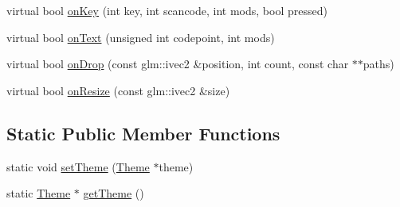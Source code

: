 \begin{DoxyCompactItemize}
\item 
virtual bool \mbox{\hyperlink{classec__gui_1_1_widget_a360664ea02b08a96e19c4c1cbdcd0fc8}{on\+Key}} (int key, int scancode, int mods, bool pressed)
\item 
virtual bool \mbox{\hyperlink{classec__gui_1_1_widget_a794ce0ee48989a1dbc40cad96a11eb9a}{on\+Text}} (unsigned int codepoint, int mods)
\item 
virtual bool \mbox{\hyperlink{classec__gui_1_1_widget_a4f4db0e6b761f3d659f2426d152a0ae2}{on\+Drop}} (const glm\+::ivec2 \&position, int count, const char $\ast$$\ast$paths)
\item 
virtual bool \mbox{\hyperlink{classec__gui_1_1_widget_a8894ab7ea0791865e6fe8ea5d909f071}{on\+Resize}} (const glm\+::ivec2 \&size)
\end{DoxyCompactItemize}
\subsection*{Static Public Member Functions}
\begin{DoxyCompactItemize}
\item 
static void \mbox{\hyperlink{classec__gui_1_1_widget_ab3f5e730d1360f86b17ebebd951723d2}{set\+Theme}} (\mbox{\hyperlink{classec__gui_1_1_theme}{Theme}} $\ast$theme)
\item 
static \mbox{\hyperlink{classec__gui_1_1_theme}{Theme}} $\ast$ \mbox{\hyperlink{classec__gui_1_1_widget_a32f0b514e4093da728d45e13e2948af2}{get\+Theme}} ()
\end{DoxyCompactItemize}
